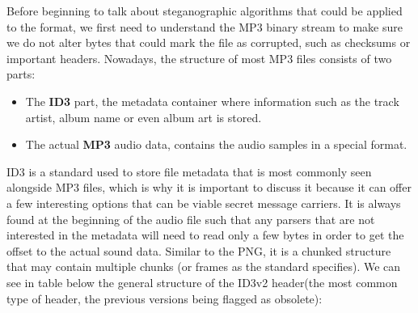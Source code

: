 Before beginning to talk about steganographic algorithms that could be applied to the format, we first need to understand the MP3 binary stream to make sure we do not alter bytes that could mark the file as corrupted, such as checksums or important headers. Nowadays, the structure of most MP3 files consists of two parts:
\begin{itemize}
	\item The \textbf{ID3} part, the metadata container where information such as the track artist, album name or even album art is stored.
	\item The actual \textbf{MP3} audio data, contains the audio samples in a special format.
\end{itemize}

ID3 is a standard used to store file metadata that is most commonly seen alongside MP3 files, which is why it is important to discuss it because it can offer a few interesting options that can be viable secret message carriers. It is always found at the beginning of the audio file such that any parsers that are not interested in the metadata will need to read only a few bytes in order to get the offset to the actual sound data. Similar to the PNG, it is a chunked structure that may contain multiple chunks (or frames as the standard specifies). We can see in table below the general structure of the ID3v2 header(the most common type of header, the previous versions being flagged as obsolete):

